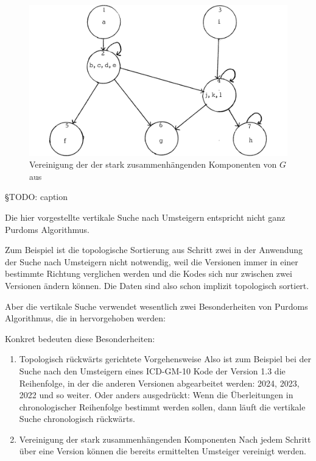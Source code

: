 \begin{figure}[H]
    \centering
    \includegraphics[width=.6\linewidth]{../img/purdom_g2.png}
    \caption{Vereinigung der der stark zusammenhängenden Komponenten von $G$ aus \cite[Seite 78]{purdom1970transitive}}
\end{figure}

{\color{blue} §TODO: caption}

Die hier vorgestellte vertikale Suche nach Umsteigern entspricht nicht ganz Purdoms Algorithmus.

Zum Beispiel ist die topologische Sortierung aus Schritt zwei in der Anwendung der Suche nach Umsteigern nicht notwendig, weil die Versionen immer in einer bestimmte Richtung verglichen werden und die Kodes sich nur zwischen zwei Versionen ändern können. Die Daten sind also schon implizit topologisch sortiert. 

Aber die vertikale Suche verwendet wesentlich zwei Besonderheiten von Purdoms Algorithmus, die in \cite[Seite 76f]{dar1993augmenting} hervorgehoben werden:

\begin{figure}[H]
    \centering
    \setlength{\fboxsep}{10pt}\color{black!20}
    \normalcolor%
\end{figure}

Konkret bedeuten diese Besonderheiten:

\begin{enumerate}
\item Topologisch rückwärts gerichtete Vorgehensweise \newline Also ist zum Beispiel bei der Suche nach den Umsteigern eines ICD-GM-10 Kode der Version 1.3 die Reihenfolge, in der die anderen Versionen abgearbeitet werden: 2024, 2023, 2022 und so weiter. Oder anders ausgedrückt: Wenn die Überleitungen in chronologischer Reihenfolge bestimmt werden sollen, dann läuft die vertikale Suche chronologisch rückwärts. 
\item Vereinigung der stark zusammenhängenden Komponenten \newline
Nach jedem Schritt über eine Version können die bereits ermittelten Umsteiger vereinigt werden. 
\end{enumerate}


